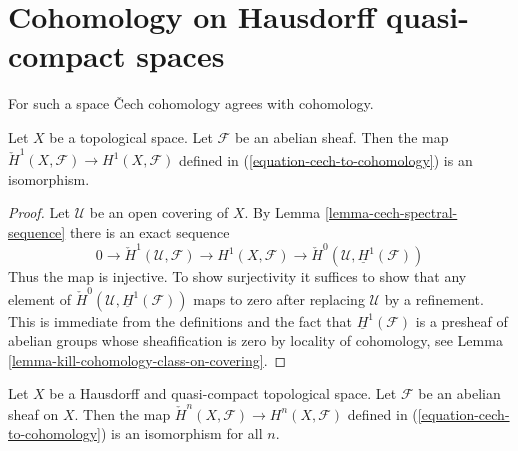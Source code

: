 \section{Cohomology on Hausdorff quasi-compact spaces}
\label{section-cohomology-LC}

\noindent
For such a space {\v C}ech cohomology agrees with cohomology.

\begin{lemma}
\label{lemma-cech-always}
Let $X$ be a topological space. Let $\mathcal{F}$ be an abelian sheaf. Then
the map $\check{H}^1(X, \mathcal{F}) \to H^1(X, \mathcal{F})$ defined
in (\ref{equation-cech-to-cohomology}) is an isomorphism.
\end{lemma}

\begin{proof}
Let $\mathcal{U}$ be an open covering of $X$.
By Lemma \ref{lemma-cech-spectral-sequence}
there is an exact sequence
$$
0 \to \check{H}^1(\mathcal{U}, \mathcal{F}) \to H^1(X, \mathcal{F})
\to \check{H}^0(\mathcal{U}, \underline{H}^1(\mathcal{F}))
$$
Thus the map is injective. To show surjectivity it suffices to show that
any element of $\check{H}^0(\mathcal{U}, \underline{H}^1(\mathcal{F}))$
maps to zero after replacing $\mathcal{U}$ by a refinement.
This is immediate from the definitions and the fact that
$\underline{H}^1(\mathcal{F})$ is a presheaf of abelian groups
whose sheafification is zero by locality of cohomology, see
Lemma \ref{lemma-kill-cohomology-class-on-covering}.
\end{proof}

\begin{lemma}
\label{lemma-cech-Hausdorff-quasi-compact}
Let $X$ be a Hausdorff and quasi-compact topological space. Let
$\mathcal{F}$ be an abelian sheaf on $X$. Then
the map $\check{H}^n(X, \mathcal{F}) \to H^n(X, \mathcal{F})$ defined
in (\ref{equation-cech-to-cohomology}) is an isomorphism for
all $n$.
\end{lemma}

